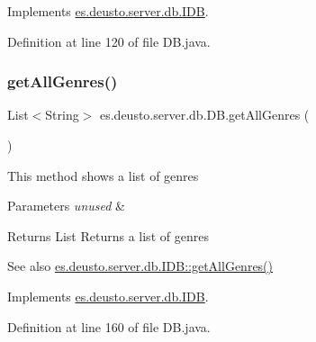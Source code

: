 Implements \hyperlink{interfacees_1_1deusto_1_1server_1_1db_1_1_i_d_b_a76af81d4bb71c81490da92d67c5b6d03}{es.\+deusto.\+server.\+db.\+I\+DB}.



Definition at line 120 of file D\+B.\+java.

\mbox{\label{classes_1_1deusto_1_1server_1_1db_1_1_d_b_a741c4c8b38c31010d5c86e1586ffa880}} 
\subsubsection{\texorpdfstring{get\+All\+Genres()}{getAllGenres()}}
{\footnotesize\ttfamily List$<$String$>$ es.\+deusto.\+server.\+db.\+D\+B.\+get\+All\+Genres (\begin{DoxyParamCaption}{ }\end{DoxyParamCaption})}

This method shows a list of genres 
\begin{DoxyParams}{Parameters}
{\em unused} & \\
\hline
\end{DoxyParams}
\begin{DoxyReturn}{Returns}
List Returns a list of genres 
\end{DoxyReturn}
\begin{DoxySeeAlso}{See also}
\hyperlink{interfacees_1_1deusto_1_1server_1_1db_1_1_i_d_b_ab0d82284b373b0ea3e0c441892e678b5}{es.\+deusto.\+server.\+db.\+I\+D\+B\+::get\+All\+Genres()} 
\end{DoxySeeAlso}


Implements \hyperlink{interfacees_1_1deusto_1_1server_1_1db_1_1_i_d_b_ab0d82284b373b0ea3e0c441892e678b5}{es.\+deusto.\+server.\+db.\+I\+DB}.



Definition at line 160 of file D\+B.\+java.

\mbox{\label{classes_1_1deusto_1_1server_1_1db_1_1_d_b_a1c471589284782e7ff1190f2b6c2369e}} 
